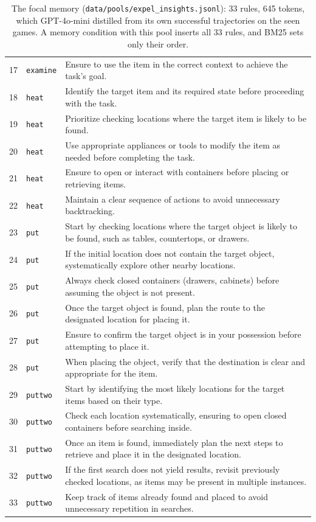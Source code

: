 \begin{table}[p]
\begin{tabular}{@{}rlL{0.82\textwidth}@{}}
17 & \texttt{examine} & Ensure to use the item in the correct context to achieve the task's goal. \\
18 & \texttt{heat} & Identify the target item and its required state before proceeding with the task. \\
19 & \texttt{heat} & Prioritize checking locations where the target item is likely to be found. \\
20 & \texttt{heat} & Use appropriate appliances or tools to modify the item as needed before completing the task. \\
21 & \texttt{heat} & Ensure to open or interact with containers before placing or retrieving items. \\
22 & \texttt{heat} & Maintain a clear sequence of actions to avoid unnecessary backtracking. \\
23 & \texttt{put} & Start by checking locations where the target object is likely to be found, such as tables, countertops, or drawers. \\
24 & \texttt{put} & If the initial location does not contain the target object, systematically explore other nearby locations. \\
25 & \texttt{put} & Always check closed containers (drawers, cabinets) before assuming the object is not present. \\
26 & \texttt{put} & Once the target object is found, plan the route to the designated location for placing it. \\
27 & \texttt{put} & Ensure to confirm the target object is in your possession before attempting to place it. \\
28 & \texttt{put} & When placing the object, verify that the destination is clear and appropriate for the item. \\
29 & \texttt{puttwo} & Start by identifying the most likely locations for the target items based on their type. \\
30 & \texttt{puttwo} & Check each location systematically, ensuring to open closed containers before searching inside. \\
31 & \texttt{puttwo} & Once an item is found, immediately plan the next steps to retrieve and place it in the designated location. \\
32 & \texttt{puttwo} & If the first search does not yield results, revisit previously checked locations, as items may be present in multiple instances. \\
33 & \texttt{puttwo} & Keep track of items already found and placed to avoid unnecessary repetition in searches. \\
\bottomrule
\end{tabular}
\caption{The focal memory (\texttt{data/pools/expel\_insights.jsonl}): 33 rules, 645 tokens, which
GPT-4o-mini distilled from its own successful trajectories on the seen games. A memory condition with
this pool inserts all 33 rules, and BM25 sets only their order.}
\label{tab:focal}
\end{table}

